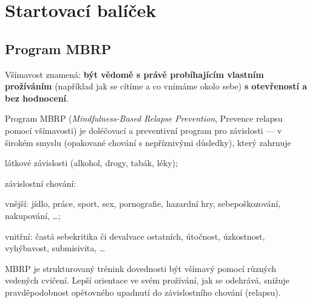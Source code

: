 \bgroup
	\cleardoublepage
	\setcounter{section}{-1}
	\titleformat{\section}[frame]{}{}{1em}{\Large\scshape\bfseries}
	\section{Startovací balíček}
\egroup	



\subsection{Program MBRP}
	Všímavost znamená: \textbf{být vědomě s právě probíhajícím vlastním prožíváním} (například jak se cítíme a co vnímáme okolo sebe) \textbf{s otevřeností a bez hodnocení}.

	Program MBRP (\emph{Mindfulness-Based Relapse Prevention}, Prevence relapsu pomocí všímavosti) je doléčovací a preventivní program pro závislosti — v širokém smyslu (opakované chování s nepříznivými důsledky), který zahrnuje
	\begin{itemize*}
		\item látkové závislosti (alkohol, drogy, tabák, léky);
		\item závislostní chování:
			\begin{itemize*}
				\item vnější: jídlo, práce, sport, sex, pornografie, hazardní hry, sebepoškozování, nakupování, …;
				\item vnitřní: častá sebekritika či devalvace ostatních, útočnost, úzkostnost, vyhýbavost, submisivita, …
			\end{itemize*}
	\end{itemize*}

	MBRP je strukturovaný trénink dovednosti být všímavý pomocí různých vedených cvičení. Lepší orientace ve svém prožívání, jak se odehrává, snižuje pravděpodobnost opětovného upadnutí do závislostního chování (relapsu).

